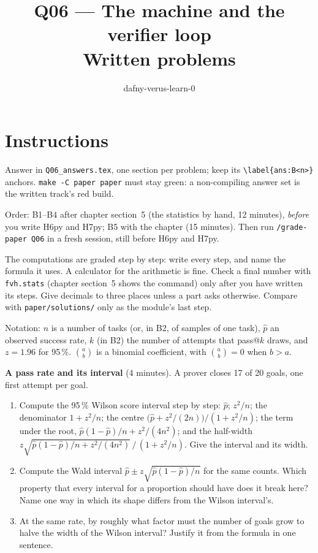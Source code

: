 \documentclass[11pt]{article}
\title{Q06 --- The machine and the verifier loop \\ \large Written problems}
\author{dafny-verus-learn-0}
\date{}
\begin{document}
\maketitle

\section*{Instructions}
Answer in \texttt{Q06\_answers.tex}, one section per problem; keep its
\verb+\label{ans:B<n>}+ anchors. \texttt{make -C paper paper} must stay green:
a non-compiling answer set is the written track's red build.

Order: B1--B4 after chapter section~5 (the statistics by hand, 12 minutes),
\emph{before} you write H6py and H7py; B5 with the chapter (15 minutes). Then
run \texttt{/grade-paper Q06} in a fresh session, still before H6py and H7py.

The computations are graded step by step: write every step, and name the
formula it uses. A calculator for the arithmetic is fine. Check a final number
with \texttt{fvh.stats} (chapter section~5 shows the command) only after you
have written its steps. Give decimals to three places unless a part asks
otherwise. Compare with \texttt{paper/solutions/} only as the module's last
step.

Notation: $n$ is a number of tasks (or, in B2, of samples of one task),
$\hat p$ an observed success rate, $k$ (in B2) the number of attempts that
pass@$k$ draws, and $z = 1.96$ for 95\,\%. $\binom{a}{b}$ is a binomial
coefficient, with $\binom{a}{b} = 0$ when $b > a$.

\begin{problem}\label{prob:B1}
\textbf{A pass rate and its interval} (4 minutes). A prover closes 17 of 20
goals, one first attempt per goal.
\begin{enumerate}
\item[(a)] Compute the 95\,\% Wilson score interval step by step: $\hat p$;
  $z^2/n$; the denominator $1 + z^2/n$; the centre
  $\bigl(\hat p + z^2/(2n)\bigr) / (1 + z^2/n)$; the term under the root,
  $\hat p(1 - \hat p)/n + z^2/(4n^2)$; and the half-width
  $z \sqrt{\hat p(1 - \hat p)/n + z^2/(4n^2)} \,/\, (1 + z^2/n)$. Give the
  interval and its width.
\item[(b)] Compute the Wald interval $\hat p \pm z\sqrt{\hat p(1 - \hat p)/n}$
  for the same counts. Which property that every interval for a proportion
  should have does it break here? Name one way in which its shape differs from
  the Wilson interval's.
\item[(c)] At the same rate, by roughly what factor must the number of goals
  grow to halve the width of the Wilson interval? Justify it from the formula
  in one sentence.
\end{enumerate}
\end{problem}
\end{document}
